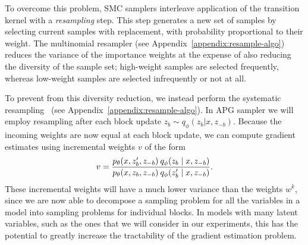 \documentclass{article}
\theoremstyle{definition}
\begin{document}
To overcome this problem, SMC samplers interleave application of the transition kernel with a \emph{resampling} step. This step generates a new set of samples by selecting current samples with replacement, with probability proportional to their weight.
The multinomial resampler (see Appendix~\ref{appendix:resample-algo}) reduces the variance of the importance weights at the expense of also reducing the diversity of the sample set; high-weight samples are selected frequently, whereas low-weight samples are selected infrequently or not at all.

To prevent from this diversity reduction, we instead perform the systematic resampling~\cite{murray2012gpu} (see Appendix~\ref{appendix:resample-algo}). 
In APG sampler we will employ resampling after each block update $z_b\sim q_\phi(z_b | x, z_{-b})$. Because the incoming weights are now equal at each block update, we can compute gradient estimates using incremental weights $v$ of the form
\begin{align}
    v
    = 
    \frac{p_\theta(x, z'_b, z_{-b}) \: q_\phi(z_b \mid  x, z_{-b})}
         {p_\theta(x, z_b, z_{-b}) \: q_\phi(z'_b \mid  x, z_{-b})}
    .
\end{align}
These incremental weights will have a much lower variance than the weights $w^k$, since we are now able to decompose a sampling problem for all the variables in a model into sampling problems for individual blocks. In models with many latent variables, such as the ones that we will consider in our experiments, this has the potential to greatly increase the tractability of the gradient estimation problem. 
\end{document}
